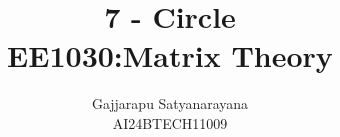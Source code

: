 \documentclass[journal]{IEEEtran}
\begin{document}

\vspace{3cm}

\title{
7 - Circle \\
\large EE1030:Matrix Theory
}
\author{Gajjarapu Satyanarayana\\AI24BTECH11009
}
{\let\newpage\relax\maketitle}

\renewcommand{\thefigure}{\theenumi}
\renewcommand{\thetable}{\theenumi}



\renewcommand{\thetable}{\theenumi}
\end{document}

